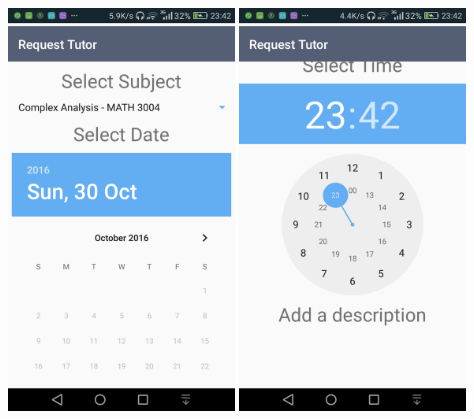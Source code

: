 \documentclass[12pt]{article}
\begin{document}
\begin{flushleft}
\includegraphics[width=60mm]{./Sprint3Models/Screenshot/requestutor.png}
\includegraphics[width=60mm]{./Sprint3Models/Screenshot/descrip.png}
\end{flushleft}
\end{document}
